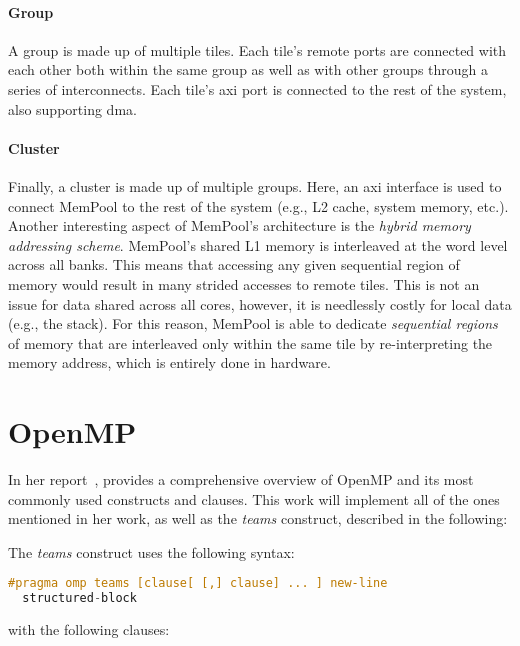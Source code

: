 \paragraph{Group} A group is made up of multiple tiles. Each tile's remote ports are connected with
each other both within the same group as well as with other groups through a series of
interconnects. Each tile's \gls{axi} port is connected to the rest of the system, also supporting
\gls{dma}.

\paragraph{Cluster} Finally, a cluster is made up of multiple groups. Here, an \gls{axi} interface
is used to connect MemPool to the rest of the system (e.g., L2 cache, system memory, etc.).
\\

Another interesting aspect of MemPool's architecture is the \emph{hybrid memory addressing scheme}.
MemPool's shared L1 memory is interleaved at the word level across all banks. This means that
accessing any given sequential region of memory would result in many strided accesses to remote
tiles. This is not an issue for data shared across all cores, however, it is needlessly costly for
local data (e.g., the stack). For this reason, MemPool is able to dedicate \emph{sequential regions}
of memory that are interleaved only within the same tile by re-interpreting the memory address,
which is entirely done in hardware.

\section{OpenMP}
\label{sec:openmp}

In her report~\cite{herokmp}, \citeauthor{herokmp} provides a comprehensive overview of OpenMP and
its most commonly used constructs and clauses. This work will implement all of the ones mentioned in
her work, as well as the \emph{teams} construct, described in the following:

The \emph{teams} construct uses the following syntax:

\begin{lstlisting}[language=C, caption={teams construct}, label={lst:teams}]
#pragma omp teams [clause[ [,] clause] ... ] new-line
  structured-block
\end{lstlisting}

with the following clauses:

